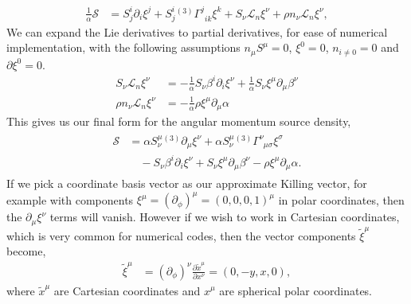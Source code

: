 \begin{align}
\frac{1}{\alpha}\mathcal{S} &= S^i_{j}\partial_i \xi^j + S^i_{j} {}^{(3)}\Gamma^j_{\,\,\,i k} \xi^k + S_\nu \mathcal{L}_n \xi^\nu + \rho n_\nu \mathcal{L}_n \xi^\nu,
\end{align}
We can expand the Lie derivatives to partial derivatives, for ease of numerical implementation, with the following assumptions $n_\mu S^\mu = 0$, $\xi^0 = 0$, $n_{i\neq0}=0$ and $\partial \xi^0 = 0$.
\begin{align}
S_\nu \mathcal{L}_n \xi^\nu &= -\frac{1}{\alpha} S_\nu \beta^i \partial_i \xi^\nu  + \frac{1}{\alpha}S_\nu \xi^\mu \partial_\mu \beta^\nu \\
\rho n_\nu \mathcal{L}_n \xi^\nu &= -\frac{1}{\alpha} \rho \xi^\mu \partial_\mu \alpha
\end{align}
This gives us our final form for the angular momentum source density,
\begin{align}\label{q:s_explicit}
\begin{split}
\mathcal{S} &= \alpha S^\mu_{\nu}{}^{(3)}\partial_\mu \xi^\nu + \alpha S^\mu_{\nu} {}^{(3)}\Gamma^\nu_{\,\,\,\mu \sigma} \xi^\sigma \\&\quad- S_\nu \beta^i \partial_i \xi^\nu  + S_\nu \xi^\mu \partial_\mu \beta^\nu - \rho \xi^\mu \partial_\mu \alpha.
\end{split}
\end{align}
If we pick a coordinate basis vector as our approximate Killing vector, for example with components $\xi^\mu = (\partial_\phi)^\mu =(0,0,0,1)^\mu$ in polar coordinates, then the $\partial_\mu \xi^\nu$ terms will vanish. However if we wish to work in Cartesian coordinates, which is very common for numerical codes, then the vector components $\tilde\xi^\mu$ become,
\begin{align}
\tilde \xi ^\mu  &= (\partial_\phi)^\nu \frac{\partial \tilde x^\mu}{\partial x^\nu}=  (0,-y,x,0),
\end{align}
where $\tilde x^\mu$ are Cartesian coordinates and $x^\mu$ are spherical polar coordinates.








